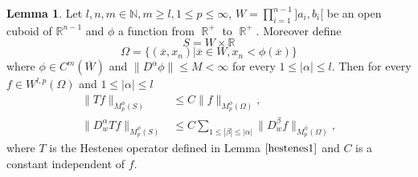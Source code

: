 \documentclass[12pt]{article}
\theoremstyle{definition}
\newtheorem{lemma}{Lemma}
\DeclareMathOperator\rr{\mathbb{R}}
\begin{document}
\begin{lemma}\label{hmorrey1}
Let $l,n,m \in \mathbb{N},m\ge l, 1\le p \le \infty$, $W = \prod\limits_{i=1}^{n-1}]a_i,b_i[$ be an open cuboid of $\mathbb{R}^{n-1}$ and $\phi$ a function from $\rr^+$ to $\rr^+$. Moreover define
\[ S=W \times \mathbb{R} \]
\[\Omega =\{ (\overline x,x_n) | \overline x\in W, x_n<\phi(\overline x)  \} \]
where $\phi \in C^m(\overline W)$ and $\| D^{\alpha}\phi \|\le M <\infty $ for every $1\le|\alpha|\le l$. Then for every $f \in W^{l,p}(\Omega)$  and  $1\le |\alpha|\le l$
\begin{align}
\| Tf\|_{M_p^\phi(S)} &\le    C\| f\|_{M_p^\phi(\Omega)} ,\\
\| D^\alpha_w Tf\|_{M_p^\phi(S)} &\le   C\sum_{1\le |\beta|\le|\alpha| }\| D^\beta_wf\|_{M_p^\phi(\Omega)},
\end{align}
where $T$ is the Hestenes operator defined in Lemma $\ref{hestenes1}$ and $C$ is a constant independent of $f$.
\end{lemma}
\end{document}
